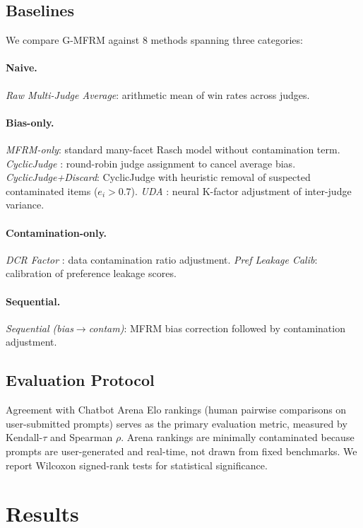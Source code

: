 \documentclass[11pt,twocolumn]{article}
\newcommand{\gmfrm}{\textsc{G-MFRM}}
\begin{document}
\subsection{Baselines}

We compare \gmfrm{} against 8 methods spanning three categories:

\paragraph{Naive.} \emph{Raw Multi-Judge Average}: arithmetic mean of win rates across judges.

\paragraph{Bias-only.} \emph{MFRM-only}: standard many-facet Rasch model without contamination term. \emph{CyclicJudge} \citep{xu2024cyclic}: round-robin judge assignment to cancel average bias. \emph{CyclicJudge+Discard}: CyclicJudge with heuristic removal of suspected contaminated items ($e_i > 0.7$). \emph{UDA} \citep{park2024uda}: neural K-factor adjustment of inter-judge variance.

\paragraph{Contamination-only.} \emph{DCR Factor} \citep{yang2025dcr}: data contamination ratio adjustment. \emph{Pref Leakage Calib}: calibration of preference leakage scores.

\paragraph{Sequential.} \emph{Sequential (bias$\to$contam)}: MFRM bias correction followed by contamination adjustment.

\subsection{Evaluation Protocol}

Agreement with Chatbot Arena Elo rankings (human pairwise comparisons on user-submitted prompts) serves as the primary evaluation metric, measured by Kendall-$\tau$ and Spearman $\rho$. Arena rankings are minimally contaminated because prompts are user-generated and real-time, not drawn from fixed benchmarks. We report Wilcoxon signed-rank tests for statistical significance.

\section{Results}
\end{document}

